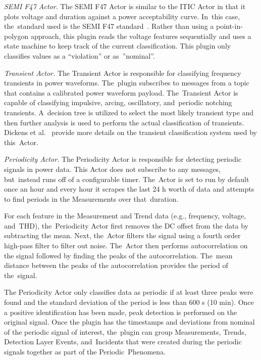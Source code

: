 \documentclass[energies,article,accept,moreauthors,pdftex]{Definitions/mdpi}
\begin{document}
{\em SEMI F47 Actor.} The SEMI F47 Actor is similar to the ITIC Actor in that it plots voltage and duration against a power acceptability curve. In~this case, the~standard used is the SEMI F47 standard~\cite{djokic_sensitivity_2005}. Rather than using a point-in-polygon approach, this plugin reads the voltage features sequentially and uses a state machine to keep track of the current classification. This plugin only classifies values as a ``violation'' or as~''nominal''.

{\em Transient Actor.} The Transient Actor is responsible for classifying frequency transients in power waveforms. The~plugin subscribes to messages from a topic that contains a calibrated power waveform payload. The~Transient Actor is capable of classifying impulsive, arcing, oscillatory, and~periodic notching transients. A~decision tree is utilized to select the most likely transient type and then further analysis is used to perform the actual classification of transients. Dickens et al.~\cite{dickens_transient_2019} provide more details on the transient classification system used by this~Actor.

{\em Periodicity Actor.} The Periodicity Actor is responsible for detecting periodic signals in power data. This Actor does not subscribe to any messages, but~instead runs off of a configurable timer. The~Actor is set to run by default once an hour and every hour it scrapes the last 24 h worth of data and attempts to find periods in the Measurements over that~duration.

For each feature in the Measurement and Trend data (e.g., frequency, voltage, and~THD), the~Periodicity Actor first removes the DC offset from the data by subtracting the mean. Next, the~Actor filters the signal using a fourth order high-pass filter to filter out noise. The~Actor then performs autocorrelation on the signal followed by finding the peaks of the autocorrelation. The~mean distance between the peaks of the autocorrelation provides the period of the~signal.

The Periodicity Actor only classifies data as periodic if at least three peaks were found and the standard deviation of the period is less than 600 s (10 min). Once a positive identification has been made, peak detection is performed on the original signal. Once the plugin has the timestamps and deviations from nominal of the periodic signal of interest, the~plugin can group Measurements, Trends, Detection Layer Events, and~Incidents that were created during the periodic signals together as part of the Periodic~Phenomena.
\end{document}
